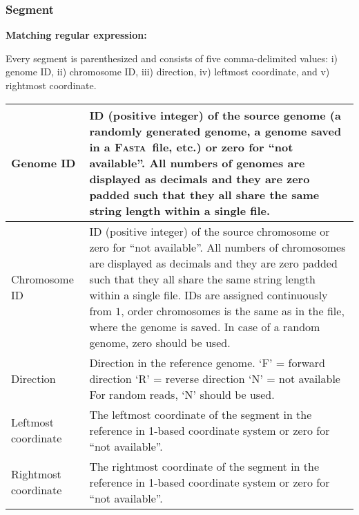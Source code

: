 \documentclass[10pt,a4paper]{article}
\newcommand{\re}[1]{\framebox{\mbox{\texttt{#1}}}}
\newcommand{\mre}[1]{\hspace{0.5cm}\textbf{Matching regular expression:} \re{#1}\smallskip}
\newcommand{\FASTA}{{\textsc{Fasta}}}
\begin{document}
%

\subsubsection*{Segment}

\mre{\char94\char92(([0-9]+),([0-9]+),([FRN]),([0-9]+),([0-9]+)\char92)\char36}

Every {segment} is parenthesized and consists
of five comma-delimited values:
i) {genome ID},
ii) {chromosome ID},
iii) {direction},
iv) {leftmost coordinate}, and
v) {rightmost coordinate}.

\medskip

\begin{tabular}{|p{3.4cm}|p{11.0cm}|}
\hline
	{Genome ID} &
		ID (positive integer) of the source genome
		(a randomly generated genome, a genome saved in a \FASTA\ file,
		etc.) or zero for ``not available''. 
		\newline\newline
		All numbers of genomes are displayed as decimals and they
		are zero padded such that
		they all share the same string length within a single file. 
		\\\hline
	{Chromosome ID} &
		ID (positive integer) of the source chromosome
		or zero for ``not available''.
		\newline
		\newline
		All numbers of chromosomes are displayed as decimals and they are zero padded such that they all share the same string length within a single file.
		\newline
		\newline
		IDs are assigned continuously from $1$,
		order chromosomes is the same as in
		the file, where the genome is saved.
		In case of a random genome, zero should be used.
		\\\hline
	{Direction} &
		Direction in the reference genome.
		\newline
		\newline
		`F' = forward direction \newline
		`R' = reverse direction \newline
		`N' = not available
		\newline
		\newline
		For random reads, `N' should be used.
		\\\hline
	{Leftmost coordinate} &
		The leftmost
		coordinate of the segment in the reference in 1-based coordinate system or zero for ``not available''. 
		\\\hline
	{Rightmost coordinate} & 
		The rightmost
		coordinate of the segment in the reference in 1-based coordinate system or zero for ``not available''. 
		\\\hline
\end{tabular}
\end{document}
